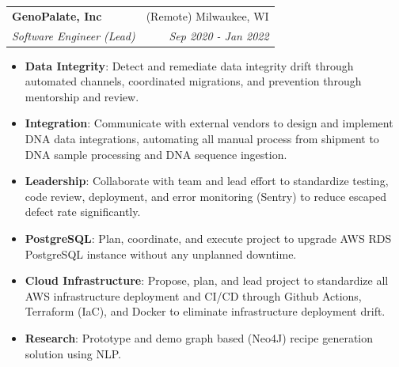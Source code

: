 \documentclass[letterpaper,11pt]{article}
\makeatletter
\newcommand{\resumeItem}[2]{
  \item\small{
    \textbf{#1}{: #2 \vspace{-2pt}}
  }
}
\newcommand{\resumeSubheading}[4]{
  \vspace{-1pt}\item
    \begin{tabular*}{0.97\textwidth}{l@{\extracolsep{\fill}}r}
      \textbf{#1} & #2 \\
      \textit{\small#3} & \textit{\small #4} \\
    \end{tabular*}\vspace{-5pt}
}
\newcommand{\resumeItemListStart}{\begin{itemize}}
\newcommand{\resumeItemListEnd}{\end{itemize}\vspace{-5pt}}
\makeatother
\begin{document}
    \resumeSubheading
      {GenoPalate, Inc}{(Remote) Milwaukee, WI}
      {Software Engineer (Lead)}{Sep 2020 - Jan 2022}
      \resumeItemListStart
        \resumeItem{Data Integrity}
          {Detect and remediate data integrity drift through automated channels, coordinated migrations, and prevention through mentorship and review.}
        \resumeItem{Integration}
          {Communicate with external vendors to design and implement DNA data integrations, automating all manual process from shipment to DNA sample processing and DNA sequence ingestion.}
        \resumeItem{Leadership}
          {Collaborate with team and lead effort to standardize testing, code review, deployment, and error monitoring (Sentry) to reduce escaped defect rate significantly.}
        \resumeItem{PostgreSQL}
          {Plan, coordinate, and execute project to upgrade AWS RDS PostgreSQL instance without any unplanned downtime.}
        \resumeItem{Cloud Infrastructure}
          {Propose, plan, and lead project to standardize all AWS infrastructure deployment and CI/CD through Github Actions, Terraform (IaC), and Docker to eliminate infrastructure deployment drift.}
        \resumeItem{Research}
          {Prototype and demo graph based (Neo4J) recipe generation solution using NLP.}
      \resumeItemListEnd
\end{document}
